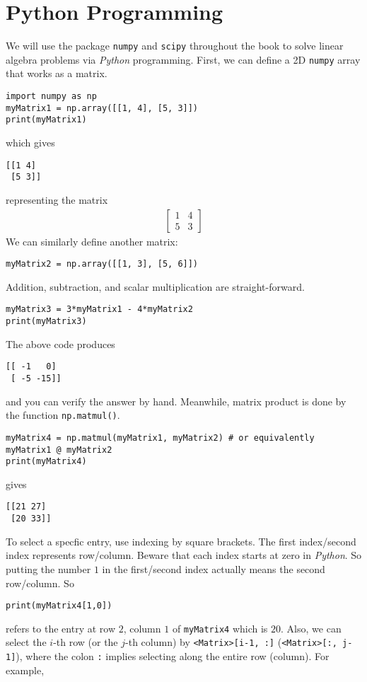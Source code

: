 \section{Python Programming}
We will use the package \texttt{numpy} and \texttt{scipy} throughout the book to solve linear algebra problems via \textit{Python} programming. First, we can define a 2D \texttt{numpy} array that works as a matrix.
\begin{lstlisting}
import numpy as np
myMatrix1 = np.array([[1, 4], [5, 3]])
print(myMatrix1)
\end{lstlisting}
which gives
\begin{lstlisting}
[[1 4]
 [5 3]]
\end{lstlisting}
representing the matrix
\begin{align*}
\begin{bmatrix}
1 & 4 \\
5 & 3
\end{bmatrix}
\end{align*}
We can similarly define another matrix:
\begin{lstlisting}
myMatrix2 = np.array([[1, 3], [5, 6]])    
\end{lstlisting}
Addition, subtraction, and scalar multiplication are straight-forward.
\begin{lstlisting}
myMatrix3 = 3*myMatrix1 - 4*myMatrix2
print(myMatrix3)
\end{lstlisting}
The above code produces
\begin{lstlisting}
[[ -1   0]
 [ -5 -15]]
\end{lstlisting}
and you can verify the answer by hand. Meanwhile, matrix product is done by the function \texttt{np.matmul()}.
\begin{lstlisting}
myMatrix4 = np.matmul(myMatrix1, myMatrix2) # or equivalently myMatrix1 @ myMatrix2
print(myMatrix4)
\end{lstlisting}
gives
\begin{lstlisting}
[[21 27]
 [20 33]]
\end{lstlisting}
To select a specfic entry, use indexing by square brackets. The first index/second index represents row/column. Beware that each index starts at zero in \textit{Python}. So putting the number $1$ in the first/second index actually means the second row/column. So
\begin{lstlisting}
print(myMatrix4[1,0])
\end{lstlisting}
refers to the entry at row $2$, column $1$ of \verb|myMatrix4| which is $20$. Also, we can select the $i$-th row (or the $j$-th column) by \verb|<Matrix>[i-1, :]| (\verb|<Matrix>[:, j-1]|), where the colon \verb|:| implies selecting along the entire row (column). For example,
